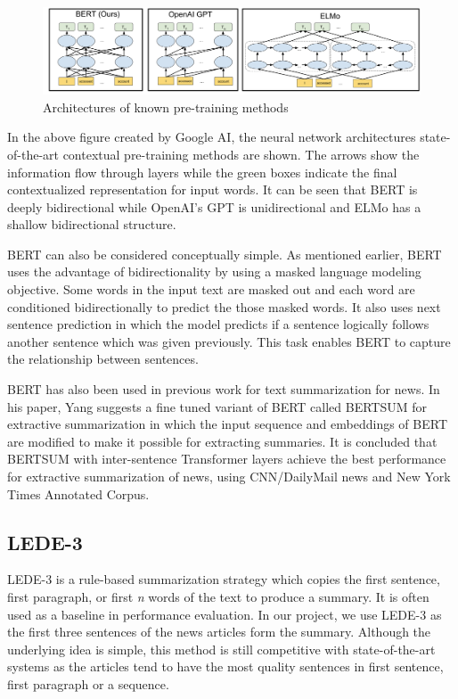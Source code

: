 \documentclass{article}
\begin{document}
\begin{figure}[h]
	\centering
	\includegraphics[scale=0.2]{bert.png}
	\caption{Architectures of known pre-training methods}
	\label{fig:mesh1}
\end{figure}

In the above figure created by Google AI, the neural network architectures state-of-the-art contextual pre-training methods are shown. The arrows show the information flow through layers while the green boxes indicate the final contextualized representation for input words. It can be seen that BERT is deeply bidirectional while OpenAI's GPT is unidirectional and ELMo has a shallow bidirectional structure.

BERT can also be considered conceptually simple. As mentioned earlier, BERT uses the advantage of bidirectionality by using a masked language modeling objective. Some words in the input text are masked out and each word are conditioned bidirectionally to predict the those masked words. It also uses next sentence prediction in which the model predicts if a sentence logically follows another sentence which was given previously. This task enables BERT to capture the relationship between sentences. \cite{devlin2019bert}

BERT has also been used in previous work for text summarization for news. In his paper, Yang suggests a fine tuned variant of BERT called BERTSUM for extractive summarization in which the input sequence and embeddings of BERT are modified to make it possible for extracting summaries. It is concluded that BERTSUM with inter-sentence Transformer layers achieve the best performance for extractive summarization of news, using CNN/DailyMail news and New York Times Annotated Corpus. \cite{liu2019finetune}


\subsection*{LEDE-3 }

LEDE-3 is a rule-based summarization strategy which copies the first sentence, first paragraph, or first \textit{n} words of the text to produce a summary. It is often used as a baseline in performance evaluation. In our project, we use LEDE-3 as the first three sentences of the news articles form the summary. Although the underlying idea is simple, this method is still competitive with state-of-the-art systems as the articles tend to have the most quality sentences in first sentence, first paragraph or a sequence. \cite{dataset}
\clearpage
\end{document}
